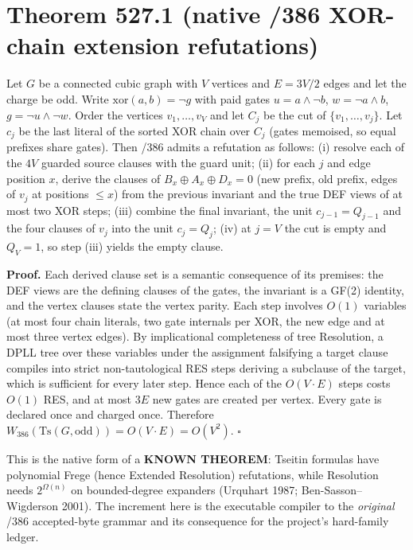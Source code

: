 \documentclass[11pt]{article}
\begin{document}
\section{Theorem 527.1 (native /386 XOR-chain extension refutations)}
Let $G$ be a connected cubic graph with $V$ vertices and $E=3V/2$ edges and let the charge be odd.
Write $\mathrm{xor}(a,b)=\neg g$ with paid gates $u=a\wedge\neg b$, $w=\neg a\wedge b$,
$g=\neg u\wedge\neg w$. Order the vertices $v_1,\dots,v_V$ and let $C_j$ be the cut of
$\{v_1,\dots,v_j\}$. Let $c_j$ be the last literal of the sorted XOR chain over $C_j$ (gates memoised,
so equal prefixes share gates). Then /386 admits a refutation as follows:
(i) resolve each of the $4V$ guarded source clauses with the guard unit;
(ii) for each $j$ and edge position $x$, derive the clauses of
$B_x\oplus A_x\oplus D_x=0$ (new prefix, old prefix, edges of $v_j$ at positions $\le x$) from the
previous invariant and the true DEF views of at most two XOR steps;
(iii) combine the final invariant, the unit $c_{j-1}=Q_{j-1}$ and the four clauses of $v_j$ into
the unit $c_j=Q_j$;
(iv) at $j=V$ the cut is empty and $Q_V=1$, so step (iii) yields the empty clause.

\textbf{Proof.} Each derived clause set is a semantic consequence of its premises: the DEF views are
the defining clauses of the gates, the invariant is a GF(2) identity, and the vertex clauses state
the vertex parity. Each step involves $O(1)$ variables (at most four chain literals, two gate
internals per XOR, the new edge and at most three vertex edges). By implicational completeness of
tree Resolution, a DPLL tree over these variables under the assignment falsifying a target clause
compiles into strict non-tautological RES steps deriving a subclause of the target, which is
sufficient for every later step. Hence each of the $O(V\cdot E)$ steps costs $O(1)$ RES, and at
most $3E$ new gates are created per vertex. Every gate is declared once and charged once.
Therefore $W_{386}(\mathrm{Ts}(G,\text{odd}))=O(V\cdot E)=O(V^2)$. \hfill$\square$

This is the native form of a \textbf{KNOWN THEOREM}: Tseitin formulas have polynomial Frege
(hence Extended Resolution) refutations, while Resolution needs $2^{\Omega(n)}$ on bounded-degree
expanders (Urquhart 1987; Ben-Sasson--Wigderson 2001). The increment here is the executable
compiler to the \emph{original} /386 accepted-byte grammar and its consequence for the project's
hard-family ledger.
\end{document}
